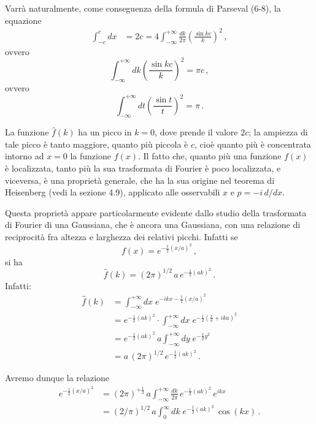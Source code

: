 \documentclass[11pt, a4paper]{book}
\numberwithin{equation}{section}
\begin{document}
Varrà naturalmente, come conseguenza della formula di Parseval (6-8), la equazione
\begin{align}
  \int_{-c}^{c} dx &= 2c = 4\int_{-\infty}^{+\infty}\frac{dk}{2\pi}\left(\frac{\sin kc}{k}\right)^2\,, \tag{5a}
\end{align}
ovvero
\begin{equation}
  \int_{-\infty}^{+\infty} dk\left(\frac{\sin kc}{k}\right)^2 = \pi c\,, \tag{5b}
\end{equation}
ovvero
\begin{equation}
  \int_{-\infty}^{+\infty} dt\left(\frac{\sin t}{t}\right)^2 = \pi\,. \tag{5c}
\end{equation}

La funzione $\hat{f}(k)$ ha un picco in $k=0$, dove prende il valore $2c$; la ampiezza di tale picco è tanto maggiore, quanto più piccola è $c$, cioè quanto più è concentrata intorno ad $x=0$ la funzione $f(x)$. Il fatto che, quanto più una funzione $f(x)$ è localizzata, tanto più la sua trasformata di Fourier è poco localizzata, e viceversa, è una proprietà generale, che ha la sua origine nel teorema di Heisenberg (vedi la sezione 4.9), applicato alle osservabili $x$ e $p=-i\,d/dx$.

Questa proprietà appare particolarmente evidente dallo studio della trasformata di Fourier di una Gaussiana, che è ancora una Gaussiana, con una relazione di reciprocità fra altezza e larghezza dei relativi picchi. Infatti se
\begin{equation}
  f(x) = e^{-\frac{1}{2}(x/a)^2}\,, \tag{6}
\end{equation}
si ha
\begin{equation}
  \hat{f}(k) = (2\pi)^{1/2}\,a\,e^{-\frac{1}{2}(ak)^2}\,. \tag{7}
\end{equation}
Infatti:
\begin{align*}
  \hat{f}(k) &= \int_{-\infty}^{+\infty} dx\;e^{-ikx-\frac{1}{2}(x/a)^2}\\
  &= e^{-\frac{1}{2}(ak)^2}\cdot\int_{-\infty}^{+\infty} dx\;
    e^{-\frac{1}{2}\left(\frac{x}{a}+ika\right)^2}\\
  &= e^{-\frac{1}{2}(ak)^2}\,a\int_{-\infty}^{+\infty} dy\;e^{-\frac{1}{2}y^2}\\
  &= a\,(2\pi)^{1/2}\,e^{-\frac{1}{2}(ak)^2}\,.
\end{align*}

Avremo dunque la relazione
\begin{align}
  e^{-\frac{1}{2}(x/a)^2}
  &= (2\pi)^{+\frac{1}{2}}\,a\int_{-\infty}^{+\infty}\frac{dk}{2\pi}\,
    e^{-\frac{1}{2}(ak)^2}\,e^{ikx} \tag{8a}\\
  &= (2/\pi)^{1/2}\,a\int_0^\infty dk\;e^{-\frac{1}{2}(ak)^2}\,\cos(kx)\,. \tag{8b}
\end{align}
\end{document}
